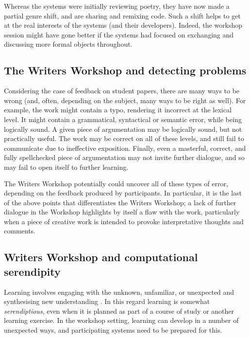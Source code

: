 Whereas the systems were initially reviewing poetry, they have now
made a partial genre shift, and are sharing and remixing code.  Such a
shift helps to get at the real interests of the systems (and their
developers).  Indeed, the workshop session might have gone better if
the systems had focused on exchanging and discussing more formal
objects throughout.

\subsection{The Writers Workshop and detecting problems}\label{sec:ww-related}

Considering the case of feedback on student papers, there are many ways to be wrong (and, often, depending on the subject, many ways to be right as well).  
For example, the work might contain a typo, rendering it incorrect at the lexical level.  It might contain a grammatical, syntactical or semantic error, while being logically sound.  A given piece of argumentation may be logically sound, but not practically useful.   The work may be correct on all of these levels, and still fail to communicate due to ineffective exposition.  Finally, even a masterful, correct, and fully spellchecked piece of argumentation may not invite further dialogue, and so may fail to open itself to further learning.

The Writers Workshop potentially could uncover all of these types of error, depending on the feedback produced by participants. In particular, it is the last of the above points that differentiates the Writers Workshop; a lack of further dialogue in the Workshop highlights by itself a flaw with the work, particularly when a piece of creative work is intended to provoke interpretative thoughts and comments. 

\subsection{Writers Workshop and computational serendipity}

Learning involves engaging with the unknown, unfamiliar, or unexpected
and synthesising new understanding \cite{deleuze1994difference}.  In
this regard learning is somewhat \emph{serendiptious}, even when it is
planned as part of a course of study or another learning exercise.  In the
workshop setting, learning can develop in a number of unexpected
ways, and participating systems need to be prepared for this.

